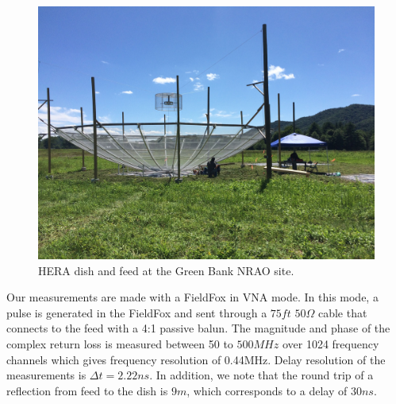 \documentclass[12pt,preprint]{aastex}
\begin{document}
\begin{figure}[ht!]
\centering
\includegraphics[trim={2cm 20cm 30cm 15cm},clip, totalheight=0.3\textheight]{plots/heradish.jpg}
\caption{HERA dish and feed at the Green Bank NRAO site.}
\label{fig:heradish}
\end{figure}

Our measurements are made with a FieldFox in VNA mode. In this mode, a pulse
is generated in the FieldFox and sent through a $75ft$ $50\Omega$ cable that
connects to the feed with a 4:1 passive balun. The magnitude and phase of the complex return loss is measured between 50 to $500MHz$ over 1024 frequency channels which gives frequency resolution of 0.44MHz. Delay resolution of the measurements is $\Delta{t}=2.22ns$.
In addition, we note that the round trip of a reflection from feed to the dish
is $9m$, which corresponds to a delay of $30ns$.


\end{document}
